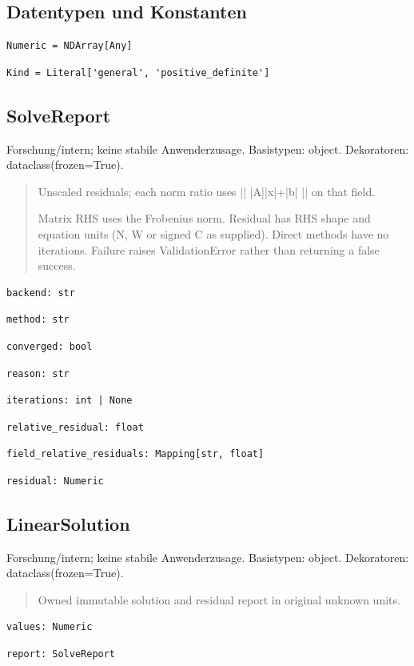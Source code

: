 \subsection*{Datentypen und Konstanten}
\begin{lstlisting}
Numeric = NDArray[Any]
\end{lstlisting}
\begin{lstlisting}
Kind = Literal['general', 'positive_definite']
\end{lstlisting}
\subsection{SolveReport}
Forschung/intern; keine stabile Anwenderzusage.
Basistypen: object. Dekoratoren: dataclass(frozen=True).
\begin{quote}
Unscaled residuals; each norm ratio uses || |A||x|+|b| || on that field.\par Matrix RHS uses the Frobenius norm. Residual has RHS shape and equation units (N, W or signed C as supplied). Direct methods have no iterations. Failure raises ValidationError rather than returning a false success.
\end{quote}
\begin{lstlisting}
backend: str
\end{lstlisting}
\begin{lstlisting}
method: str
\end{lstlisting}
\begin{lstlisting}
converged: bool
\end{lstlisting}
\begin{lstlisting}
reason: str
\end{lstlisting}
\begin{lstlisting}
iterations: int | None
\end{lstlisting}
\begin{lstlisting}
relative_residual: float
\end{lstlisting}
\begin{lstlisting}
field_relative_residuals: Mapping[str, float]
\end{lstlisting}
\begin{lstlisting}
residual: Numeric
\end{lstlisting}
\subsection{LinearSolution}
Forschung/intern; keine stabile Anwenderzusage.
Basistypen: object. Dekoratoren: dataclass(frozen=True).
\begin{quote}
Owned immutable solution and residual report in original unknown units.
\end{quote}
\begin{lstlisting}
values: Numeric
\end{lstlisting}
\begin{lstlisting}
report: SolveReport
\end{lstlisting}
